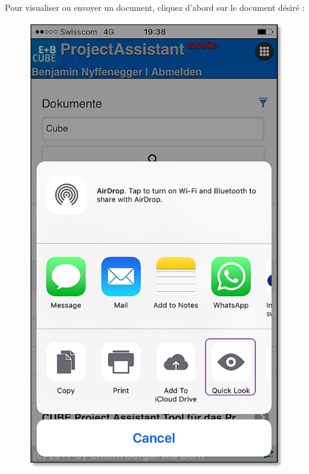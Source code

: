 
\pagebreak

Pour visualiser ou envoyer un document, cliquez d'abord sur le document désiré :

\vspace{\baselineskip}

\begin{figure}   %
  \vspace{-35pt}      %
  \begin{center}
    \includegraphics[width=1\linewidth]{../chapters/11_Dokumentenablage/pictures/11-mob06_Dokumente_anschauen.jpg}
  \end{center}
  \vspace{-20pt}
  \vspace{-10pt}
\end{figure}

